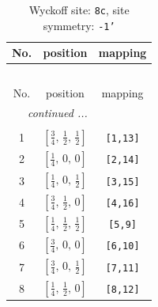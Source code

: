 \documentclass[fleqn,8pt]{jsarticle}
\begin{document}
\renewcommand{\arraystretch}{1.2}
\begin{longtable}{ccc}
\caption{Wyckoff site: {\tt 8c}, site symmetry: {\tt -1'}}
 \\
 \hline \hline
No. & position & mapping \\ \hline \endfirsthead

\multicolumn{2}{l}{\tablename\ \thetable{}} \\
 \hline \hline
No. & position & mapping \\ \hline \endhead

 \hline \hline
\multicolumn{2}{r}{\footnotesize\it continued ...} \\ \endfoot

 \hline \hline
\multicolumn{2}{r}{} \\ \endlastfoot

1 & $\left[ \frac{3}{4},\, \frac{1}{2},\, \frac{1}{2} \right]$ & {\tt [1,13]} \\ \hline
2 & $\left[ \frac{1}{4},\, 0,\, 0 \right]$ & {\tt [2,14]} \\ \hline
3 & $\left[ \frac{1}{4},\, 0,\, \frac{1}{2} \right]$ & {\tt [3,15]} \\ \hline
4 & $\left[ \frac{3}{4},\, \frac{1}{2},\, 0 \right]$ & {\tt [4,16]} \\ \hline
5 & $\left[ \frac{1}{4},\, \frac{1}{2},\, \frac{1}{2} \right]$ & {\tt [5,9]} \\ \hline
6 & $\left[ \frac{3}{4},\, 0,\, 0 \right]$ & {\tt [6,10]} \\ \hline
7 & $\left[ \frac{3}{4},\, 0,\, \frac{1}{2} \right]$ & {\tt [7,11]} \\ \hline
8 & $\left[ \frac{1}{4},\, \frac{1}{2},\, 0 \right]$ & {\tt [8,12]} \\
\end{longtable}
\renewcommand{\arraystretch}{1.2}
\end{document}
